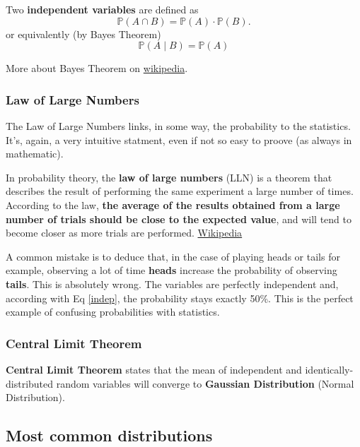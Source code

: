 \documentclass[a4paper,11pt,twoside]{article}
\newcommand*{\signed}[1]{%
  \unskip\hspace*{1em plus 1fill}%
  \nolinebreak[3]\hspace*{\fill}\mbox{#1}
}
\def \be {\begin{equation}}
\def \ee {\end{equation}}
\begin{document}
Two \textbf{independent variables} are defined as
\be
{\mathbb  {P}}(A\cap B)={\mathbb  {P}}(A)\cdot {\mathbb  {P}}(B).
\ee
or equivalently (by Bayes Theorem)
\be
\label{indep}
{\mathbb  {P}}(A\mid B) =  {\mathbb  {P}}(A)
\ee

More about Bayes Theorem on \href{https://en.wikipedia.org/wiki/Random_variable}{wikipedia}.

\subsubsection{Law of Large Numbers}

The Law of Large Numbers links, in some way, the probability to the statistics. It's, again, a very intuitive statment, even if not so easy to proove (as always in mathematic).

\begin{framed}
In probability theory, the\textbf{ law of large numbers} (LLN) is a theorem that describes the result of performing the same experiment a large number of times. According to the law, \textbf{the average of the results obtained from a large number of trials should be close to the expected value}, and will tend to become closer as more trials are performed.
\signed{\href{https://en.wikipedia.org/wiki/Law_of_large_numbers}{Wikipedia}}
\end{framed}

A common mistake is to deduce that, in the case of playing heads or tails for example, observing a lot of time \textbf{heads} increase the probability of observing \textbf{tails}. This is absolutely wrong. The variables are perfectly independent and, according with Eq \ref{indep}, the probability stays exactly 50\%. This is the perfect example of confusing probabilities with statistics.

\subsubsection{Central Limit Theorem}

\textbf{Central Limit Theorem} states that the mean of independent and identically-distributed random variables will converge to \textbf{Gaussian Distribution} (Normal Distribution).

\subsection{Most common distributions}
\end{document}
